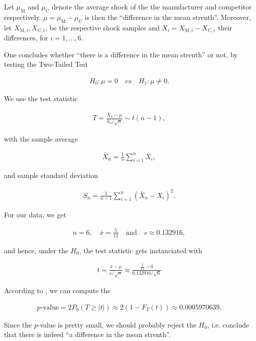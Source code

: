 \begin{solution}

Let $\mu_\mathrm{M}$ and $\mu_\mathrm{C}$ denote the average shock of the the manufacturer and competitor respectively.
$\mu = \mu_\mathrm{M} - \mu_\mathrm{C}$ is then the \enquote{difference in the mean strenth}.
Moreover, let $X_{\mathrm M, i}, X_{\mathrm C, i}$, be the respective shock samples and $X_i = X_{\mathrm M, i} - X_{\mathrm C, i}$ their differences, for $i = 1, \dots, 6$.

One concludes whether \enquote{there is a difference in the mean strenth} or not, by testing the Two-Tailed Test

\begin{align*}
    H_0: \mu = 0
    \quad
    \textit{vs}
    \quad
    H_1: \mu \neq 0.
\end{align*}

We use the test statistic

\begin{align*}
    T = \frac{\bar X_n - \mu}{S_n / \sqrt n} \sim t(n-1),
\end{align*}

with the sample average

\begin{align*}
    \bar X_n = \frac{1}{n} \sum_{i=1}^n X_i,
\end{align*}

and sample standard deviation

\begin{align*}
    S_n = \frac{1}{n-1} \sum_{i=1}^n (\bar X_n - X_i)^2.
\end{align*}

For our data, we get

\begin{align*}
    n = 6,
    \quad
    \bar x = \frac{5}{12}
    \quad
    \text{and}
    \quad
    s \approx 0.132916,
\end{align*}

and hence, under the $H_0$, the test statistic gets instanciated with

\begin{align*}
    t = \frac{\bar x - \mu}{s / \sqrt n} \approx \frac{\frac{5}{12} - 0}{0.132916 / \sqrt 6}
\end{align*}

According to \cite[lecture 9, slide 35]{EStat}, we can compute the

\begin{align*}
    \text{$p$-value}
    =
    2 P_0(T \geq |t|)
    \approx
    2 (1 - F_T(t))
    \approx
    0.0005970639.
\end{align*}

Since the $p$-value is pretty small, we should probably reject the $H_0$, i.e. conclude that there is indeed \enquote{a difference in the mean strenth}.

\end{solution}

